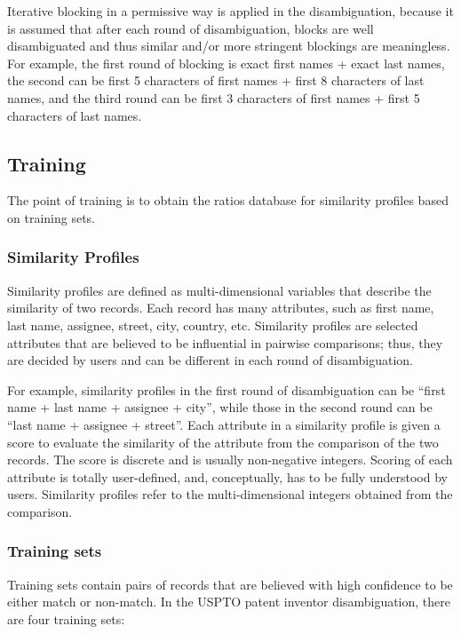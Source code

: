 \documentclass{article}
\begin{document}
Iterative blocking in a permissive way is applied in the
disambiguation, because it is assumed that after each round
of disambiguation, blocks are well disambiguated and thus
similar and/or more stringent blockings are meaningless.
For example, the first round of blocking is exact
first names + exact last names, the second can
be first 5 characters of first names + first 8 characters
of last names, and the third round can be first
3 characters of first names + first 5 characters of last names.


\subsection{Training}

The point of training is to obtain the ratios database for
similarity profiles based on training sets.

\subsubsection{Similarity Profiles}

Similarity profiles are defined as multi-dimensional variables
that describe the similarity of two records. Each record has
many attributes, such as first name, last name, assignee, street,
city, country, etc. Similarity profiles are selected attributes
that are believed to be influential in pairwise comparisons; thus,
they are decided by users and can be different in each round of
disambiguation.

For example, similarity profiles in the first round
of disambiguation can be ``first name + last name + assignee +
city'', while those in the second round can be ``last name +
assignee + street''. Each attribute in a similarity profile is
given a score to evaluate the similarity of the attribute from the
comparison of the two records. The score is discrete and is usually
non-negative integers. Scoring of each attribute is totally
user-defined, and, conceptually, has to be fully understood by users.
Similarity profiles refer to the multi-dimensional integers obtained
from the comparison.



\subsubsection{Training sets}

Training sets contain pairs of records that are believed
with high confidence to be either match or
non-match. In the USPTO patent inventor disambiguation,
there are four training sets:
\end{document}
